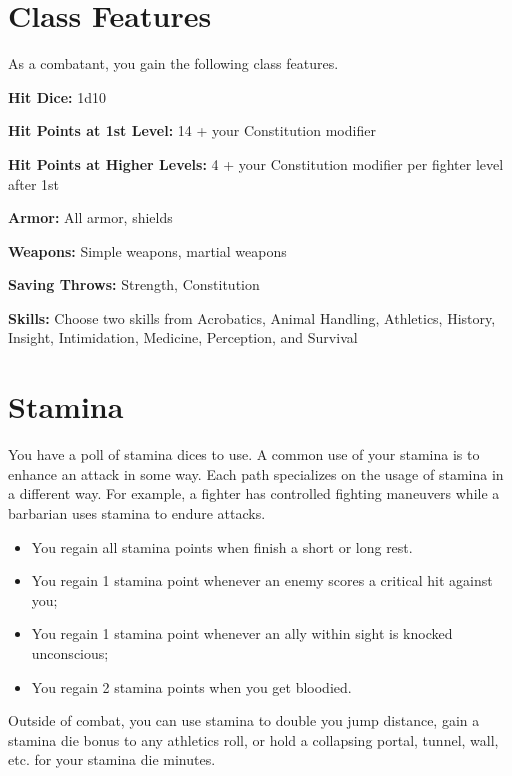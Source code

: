 \begin{multicols*}{2}

\section*{Class Features} 

As a combatant, you gain the following class features.

\textbf{Hit Dice:} 1d10

\textbf{Hit Points at 1st Level:} 14 + your Constitution modifier

\textbf{Hit Points at Higher Levels:} 4 + your Constitution modifier per fighter level after 1st


\textbf{Armor:} All armor, shields

\textbf{Weapons:} Simple weapons, martial weapons

\textbf{Saving Throws:} Strength, Constitution

\textbf{Skills:} Choose two skills from Acrobatics, Animal Handling, Athletics, History, Insight, Intimidation, Medicine, Perception, and Survival 
    
\section*{Stamina} 

You have a poll of stamina dices to use. A common use of your stamina is to enhance an attack in some way. Each path specializes on the usage of stamina in a different way. For example, a fighter has controlled fighting maneuvers while a barbarian uses stamina to endure attacks.



\begin{itemize}
    \item You regain all stamina points when finish a short or long rest.
    \item You regain 1 stamina point whenever an enemy scores a critical hit against you;
    \item You regain 1 stamina point whenever an ally within sight is knocked unconscious;
    \item You regain 2 stamina points when you get bloodied.
\end{itemize}

Outside of combat, you can use stamina to double you jump distance, gain a stamina die bonus to any athletics roll, or hold a collapsing portal, tunnel, wall, etc. for your stamina die minutes.


\end{multicols*}
